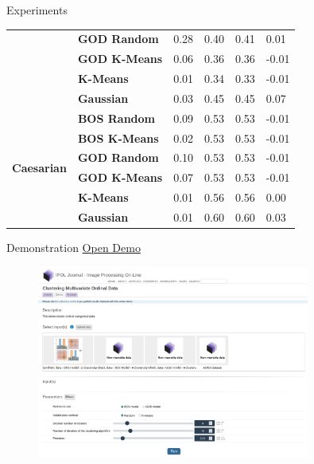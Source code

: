 \documentclass{beamer}
\begin{document}
\begin{frame}{Experiments}
\begin{table}
{\begin{tabular}{llllll}
    \textbf{} & \textbf{GOD Random} & 0.28 & 0.40 & 0.41 & 0.01 \\
    \textbf{} & \textbf{GOD K-Means} & 0.06 & 0.36 & 0.36 & -0.01 \\
    \textbf{} & \textbf{K-Means} & 0.01 & 0.34 & 0.33 & -0.01 \\
    \textbf{} & \textbf{Gaussian} & 0.03 & 0.45 & 0.45 & 0.07 \\
    \cline{1-6}
    \multirow[t]{6}{*}{\textbf{Caesarian}} & \textbf{BOS Random} & 0.09 & 0.53 & 0.53 & -0.01 \\
    \textbf{} & \textbf{BOS K-Means} & 0.02 & 0.53 & 0.53 & -0.01 \\
    \textbf{} & \textbf{GOD Random} & 0.10 & 0.53 & 0.53 & -0.01 \\
    \textbf{} & \textbf{GOD K-Means} & 0.07 & 0.53 & 0.53 & -0.01 \\
    \textbf{} & \textbf{K-Means} & 0.01 & 0.56 & 0.56 & 0.00 \\
    \textbf{} & \textbf{Gaussian} & 0.01 & 0.60 & 0.60 & 0.03 \\
    \cline{1-6}
    \end{tabular}
    }
    \end{table}

\end{frame}

\begin{frame}{Demonstration}
    \href{https://ipolcore.ipol.im/demo/clientApp/demo.html?id=77777000487}{Open Demo}
    \begin{figure}
        \includegraphics[width=0.8\textwidth]{Attachments/demo.png}
    \end{figure}
\end{frame}
\end{document}
